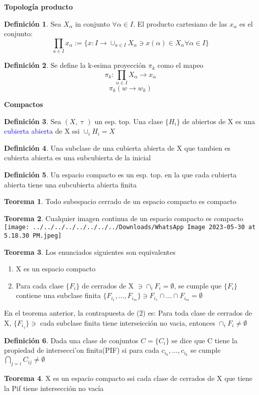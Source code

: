 \documentclass{article}
\theoremstyle{definition}
\newtheorem{definition}{Definición}[section]
\newtheorem{theorem}{Teorema}[section]
\begin{document}
\begin{LARGE}
	\textbf{Topología producto}
\end{LARGE}
\begin{definition}
	Sea $X_{\alpha}$ in conjunto $\forall \alpha \in I$. El producto cartesiano de las $x_{\alpha}$ es el conjunto:
	\[\prod_{a\in I} x_{\alpha}:=\{x:I\to\cup_{a\in I}X_{\alpha}\ni x(\alpha) \in X_{\alpha}\forall \alpha \in I\}\]
\end{definition}
\begin{definition}
	Se define la k-esima proyección $\pi_k$ como el mapeo
	\[\pi_k: \prod_{\alpha \in I}X_{\alpha}\to x_{\alpha}\]
	\[\pi_k(w\to w_k)\]
\end{definition}
\begin{LARGE}
	\textbf{Compactos}
\end{LARGE}
\begin{definition}
	Sea $(X,\uptau)$ un esp. top. Una clase $\{H_i\}$ de abiertos de X es una \textcolor{blue}{cubierta abierta } de X ssi $\cup_iH_i=X$
\end{definition}
\begin{definition}
	Una subclase de una cubierta abierta de X que tambien es cubierta abierta es una subcubierta de la inicial
\end{definition}
\begin{definition}
	Un espacio compacto es un esp. top. en la que cada cubierta abierta tiene una subcubierta abierta finita
\end{definition}
\begin{theorem}
	Todo subespacio cerrado de un espacio compacto es compacto
\end{theorem}
\begin{theorem}
	Cualquier imagen continua de un espacio compacto es compacto\\
	\texttt{[image: ../../../../../../../../Downloads/WhatsApp Image 2023-05-30 at 5.18.30 PM.jpeg]} 
\end{theorem}
\begin{theorem}
	Los enunciados siguientes son equivalentes
	\begin{enumerate}
	\item X es un espacio compacto
	\item Para cada clase $\{F_i\}$ de cerrados de X $\ni\cap_iF_i=\emptyset$, se cumple que $\{F_i\}$ contiene una subclase finita $\{F_{i_1},...,F_{i_m}\}\ni F_{i_1}\cap ...\cap F_{i_m}=\emptyset$
\end{enumerate}
En el teorema anterior, la contrapuesta de (2) es: Para toda clase de cerrados de X, $\{F_{i_1}\}\ni$ cada subclase finita tiene interseicción no vacia, entonces $\cap_iF_i\neq\emptyset$ 
\end{theorem}
\begin{definition}
	Dada una clase de conjuntos $C=\{C_i\}$ se dice que C tiene la propiedad de intersecci'on finita(PIF) si para cada $c_{i_k},...,c_{i_k}$ se cumple $\bigcap\limits_{j=i} C_{ij}\neq \emptyset$
\end{definition}
\begin{theorem}
	X es un espacio compacto ssi cada clase de cerrados de X que tiene la Pif tiene intersección no vacía
\end{theorem}
\end{document}
